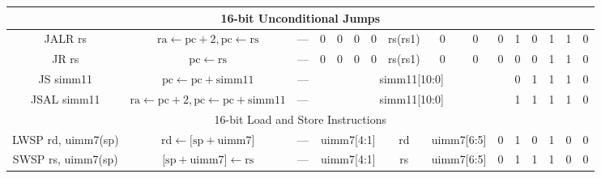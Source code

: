 \documentclass[a4paper,10pt]{article}
\begin{document}
\begin{landscape}
\begin{longtable}[c]{|c|c|@{}c@{}|@{}c@{}|@{}c@{}|@{}c@{}|@{}c@{}|@{}c@{}|@{}c@{}|@{}c@{}|@{}c@{}|@{}c@{}|@{}c@{}|@{}c@{}|@{}c@{}|@{}c@{}|@{}c@{}|@{}c@{}|@{}c@{}|@{}c@{}|@{}c@{}|@{}c@{}|@{}c@{}|@{}c@{}|@{}c@{}|@{}c@{}|}
\hline
\multicolumn{26}{|c|}{16-bit Unconditional Jumps}                                                                                                                                                                                                                                                             \\\hline
JALR rs               & $\mathrm{ra} \leftarrow \mathrm{pc} + 2, \mathrm{pc} \leftarrow \mathrm{rs}$ & \multicolumn{8}{c|}{---}                                   & 0      & 0    & 0    & 0   & \multicolumn{4}{c|}{rs(rs1)} & 0              & 0              & 0 & 1   & 0   & 1 & 1 & 0 \\
JR rs                 & $\mathrm{pc} \leftarrow \mathrm{rs}$ & \multicolumn{8}{c|}{---}                                   & 0      & 0    & 0    & 0   & \multicolumn{4}{c|}{rs(rs1)} & 0              & 0              & 0 & 0   & 0   & 1 & 1 & 0 \\
JS simm11             & $\mathrm{pc} \leftarrow \mathrm{pc} + \mathrm{simm11}$ & \multicolumn{8}{c|}{---}                                   & \multicolumn{11}{c|}{simm11{[}10:0{]}}                                                                        & 0   & 1   & 1 & 1 & 0 \\
JSAL simm11           & $\mathrm{ra} \leftarrow \mathrm{pc} + 2, \mathrm{pc} \leftarrow \mathrm{pc} + \mathrm{simm11}$ & \multicolumn{8}{c|}{---}                                   & \multicolumn{11}{c|}{simm11{[}10:0{]}}                                                                        & 1   & 1   & 1 & 1 & 0 \\

\hline
\multicolumn{26}{|c|}{16-bit Load and Store Instructions}                                                                                                                                                                                                                                                             \\\hline
LWSP rd, uimm7(sp)    & $\mathrm{rd} \leftarrow {[}\mathrm{sp} + \mathrm{uimm7}{]}$ & \multicolumn{8}{c|}{---}                                   & \multicolumn{4}{c|}{uimm7{[}4:1{]}} & \multicolumn{4}{c|}{rd}      & \multicolumn{2}{c|}{uimm7{[}6:5{]}}  & 0   & 1   & 0   & 1 & 0 & 0 \\
SWSP rs, uimm7(sp)    & ${[}\mathrm{sp} + \mathrm{uimm7}{]} \leftarrow \mathrm{rs}$ & \multicolumn{8}{c|}{---}                                   & \multicolumn{4}{c|}{uimm7{[}4:1{]}} & \multicolumn{4}{c|}{rs}      & \multicolumn{2}{c|}{uimm7{[}6:5{]}}  & 0   & 1   & 1   & 1 & 0 & 0 \\


\end{longtable}
\end{landscape}
\end{document}
